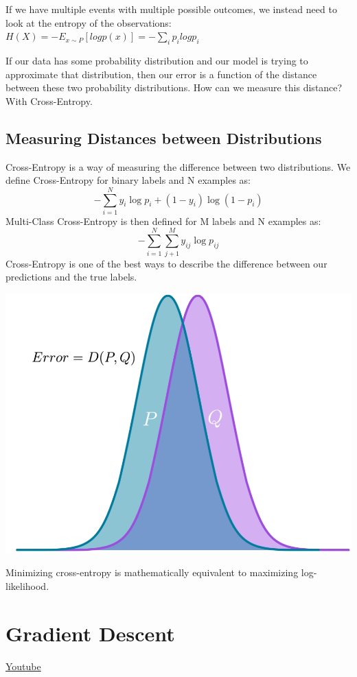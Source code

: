 If we have multiple events with multiple possible outcomes, we instead need to look at the entropy of the observations: \(H(X) = -E_{x \sim P}[log p(x)] = - \sum_i p_i log p_i\) \newline

If our data has some probability distribution and our model is trying to approximate that distribution, then our error is a function of the distance between these two probability distributions. How can we measure this distance? With Cross-Entropy.

\subsection{Measuring Distances between Distributions}

Cross-Entropy is a way of measuring the difference between two distributions. We define Cross-Entropy for binary labels and N examples as: \[-\sum_{i=1}^N y_i \log p_i + (1 - y_i)\log(1 - p_i) \]
Multi-Class Cross-Entropy is then defined for M labels and N examples as: \[-\sum_{i = 1}^N \sum_{j+1}^M y_{ij} \log p_{ij}\]
Cross-Entropy is one of the best ways to describe the difference between our predictions and the true labels.

\includegraphics[width=0.75\linewidth]{img//intro/error.jpeg}

Minimizing cross-entropy is mathematically equivalent to maximizing log-likelihood.

\section{Gradient Descent}
\href{https://www.youtube.com/watch?v=rhVIF-nigrY&t=15s&ab_channel=Udacity}{Youtube}

